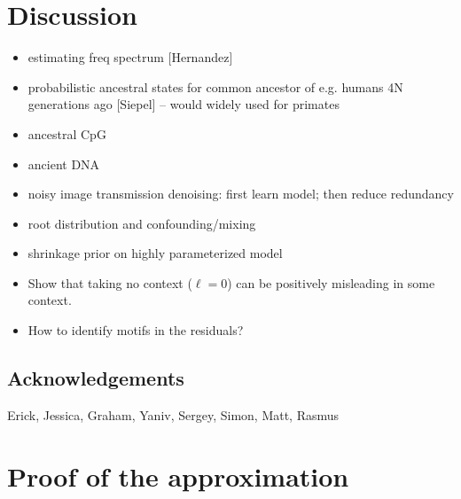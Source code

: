 \documentclass{article}
\theoremstyle{plain}
\theoremstyle{definition}
\begin{document}
\section{Discussion}


\begin{itemize}

  \item estimating freq spectrum [Hernandez]

  \item probabilistic ancestral states for common ancestor of e.g. humans 4N generations ago [Siepel] -- would widely used for primates

  \item ancestral CpG

  \item ancient DNA

  \item noisy image transmission denoising: first learn model; then reduce redundancy

  \item root distribution and confounding/mixing

  \item shrinkage prior on highly parameterized model

  \item Show that taking no context ($\ell=0$) can be positively misleading in some context.

  \item How to identify motifs in the residuals?

\end{itemize}

\subsection{Acknowledgements}
Erick, Jessica, Graham, Yaniv, Sergey, Simon, Matt, Rasmus



\appendix

\section{Proof of the approximation}
\label{ss:approx_pf}
\end{document}
